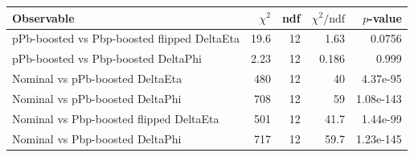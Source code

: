 \begin{tabular}{|l|r|r|r|r|}
\hline
Observable & $\chi^2$ & ndf & $\chi^2/\mathrm{ndf}$ & $p$-value \\
\hline
pPb-boosted vs Pbp-boosted flipped DeltaEta & 19.6 & 12 & 1.63 & 0.0756 \\
pPb-boosted vs Pbp-boosted DeltaPhi & 2.23 & 12 & 0.186 & 0.999 \\
Nominal vs pPb-boosted DeltaEta & 480 & 12 & 40 & 4.37e-95 \\
Nominal vs pPb-boosted DeltaPhi & 708 & 12 & 59 & 1.08e-143 \\
Nominal vs Pbp-boosted flipped DeltaEta & 501 & 12 & 41.7 & 1.44e-99 \\
Nominal vs Pbp-boosted DeltaPhi & 717 & 12 & 59.7 & 1.23e-145 \\
\hline
\end{tabular}
